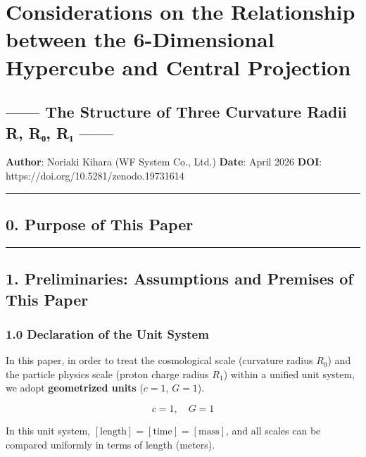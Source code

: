 \documentclass[
  a4paper,11pt]{article}
\theoremstyle{definition}
\theoremstyle{remark}
\begin{document}
\section{Considerations on the Relationship between the 6-Dimensional
Hypercube and Central
Projection}\label{considerations-on-the-relationship-between-the-6-dimensional-hypercube-and-central-projection}

\subsection{------ The Structure of Three Curvature Radii R, R₀, R₁
------}\label{the-structure-of-three-curvature-radii-r-rux2080-rux2081}

\textbf{Author}: Noriaki Kihara (WF System Co., Ltd.) \textbf{Date}:
April 2026 \textbf{DOI}: https://doi.org/10.5281/zenodo.19731614

\begin{center}\rule{0.5\linewidth}{0.5pt}\end{center}

\subsection{0. Purpose of This Paper}\label{purpose-of-this-paper}

\begin{center}\rule{0.5\linewidth}{0.5pt}\end{center}

\subsection{1. Preliminaries: Assumptions and Premises of This
Paper}\label{preliminaries-assumptions-and-premises-of-this-paper}

\subsubsection{1.0 Declaration of the Unit
System}\label{declaration-of-the-unit-system}

In this paper, in order to treat the cosmological scale (curvature
radius \(R_0\)) and the particle physics scale (proton charge radius
\(R_1\)) within a unified unit system, we adopt \textbf{geometrized
units} (\(c = 1\), \(G = 1\)).

\[c = 1, \quad G = 1\]

In this unit system,
\([\text{length}] = [\text{time}] = [\text{mass}]\), and all scales can
be compared uniformly in terms of length (meters).
\end{document}
